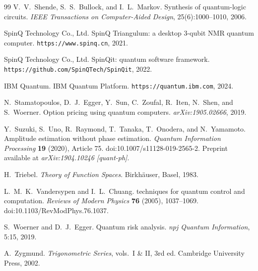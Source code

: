 \documentclass[12pt,a4paper]{article}
\theoremstyle{plain}
\theoremstyle{definition}
\theoremstyle{remark}
\begin{document}
\begin{thebibliography}{99}
V.~V.~Shende, S.~S.~Bullock, and I.~L.~Markov.
\newblock Synthesis of quantum-logic circuits.
\newblock \textit{IEEE Transactions on Computer-Aided Design},
  25(6):1000--1010, 2006.

SpinQ Technology Co., Ltd.
\newblock SpinQ Triangulum: a desktop 3-qubit NMR quantum computer.
\newblock \texttt{https://www.spinq.cn}, 2021.

SpinQ Technology Co., Ltd.
\newblock SpinQit: quantum software framework.
\newblock \texttt{https://github.com/SpinQTech/SpinQit}, 2022.

IBM Quantum.
\newblock IBM Quantum Platform.
\newblock \texttt{https://quantum.ibm.com}, 2024.

N.~Stamatopoulos, D.~J.~Egger, Y.~Sun, C.~Zoufal, R.~Iten, N.~Shen, and
  S.~Woerner.
\newblock Option pricing using quantum computers.
\newblock \textit{arXiv:1905.02666}, 2019.

Y.~Suzuki, S.~Uno, R.~Raymond, T.~Tanaka, T.~Onodera, and N.~Yamamoto.
\newblock Amplitude estimation without phase estimation.
\newblock \textit{Quantum Information Processing} \textbf{19} (2020), Article 75.
\newblock doi:10.1007/s11128-019-2565-2.
\newblock Preprint available at \textit{arXiv:1904.10246 [quant-ph]}.

H.~Triebel.
\newblock \textit{Theory of Function Spaces}.
\newblock Birkh\"{a}user, Basel, 1983.

L.~M.~K.~Vandersypen and I.~L.~Chuang.
 techniques for quantum control and computation.
\newblock \textit{Reviews of Modern Physics} \textbf{76} (2005), 1037--1069.
\newblock doi:10.1103/RevModPhys.76.1037.

S.~Woerner and D.~J.~Egger.
\newblock Quantum risk analysis.
\newblock \textit{npj Quantum Information}, 5:15, 2019.

A.~Zygmund.
\newblock \textit{Trigonometric Series}, vols.~I \& II, 3rd ed.
\newblock Cambridge University Press, 2002.

\end{thebibliography}
\end{document}

